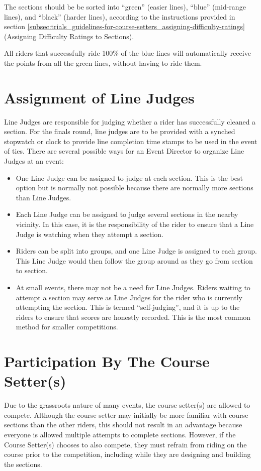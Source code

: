The sections should be be sorted into ``green'' (easier lines), ``blue'' (mid-range lines), and ``black'' (harder lines), according to the instructions provided in section \ref{subsec:trials_guidelines-for-course-setters_assigning-difficulty-ratings} (Assigning Difficulty Ratings to Sections).

All riders that successfully ride 100\% of the blue lines will automatically receive the points from all the green lines, without having to ride them.

\section{Assignment of Line Judges}
Line Judges are responsible for judging whether a rider has successfully cleaned a section.
For the finals round, line judges are to be provided with a synched stopwatch or clock to provide line completion time stamps to be used in the event of ties.
There are several possible ways for an Event Director to organize Line Judges at an event:
\begin{itemize}
\item One Line Judge can be assigned to judge at each section.
This is the best option but is normally not possible because there are normally more sections than Line Judges.
\item Each Line Judge can be assigned to judge several sections in the nearby vicinity.
In this case, it is the responsibility of the rider to ensure that a Line Judge is watching when they attempt a section.
\item Riders can be split into groups, and one Line Judge is assigned to each group.
This Line Judge would then follow the group around as they go from section to section.
\item At small events, there may not be a need for Line Judges.
Riders waiting to attempt a section may serve as Line Judges for the rider who is currently attempting the section.
This is termed ``self-judging'', and it is up to the riders to ensure that scores are honestly recorded.
This is the most common method for smaller competitions.
\end{itemize}

\section{Participation By The Course Setter(s)}

Due to the grassroots nature of many events, the course setter(s) are allowed to compete.
Although the course setter may initially be more familiar with course sections than the other riders, this should not result in an advantage because everyone is allowed multiple attempts to complete sections.
However, if the Course Setter(s) chooses to also compete, they must refrain from riding on the course prior to the competition, including while they are designing and building the sections.

